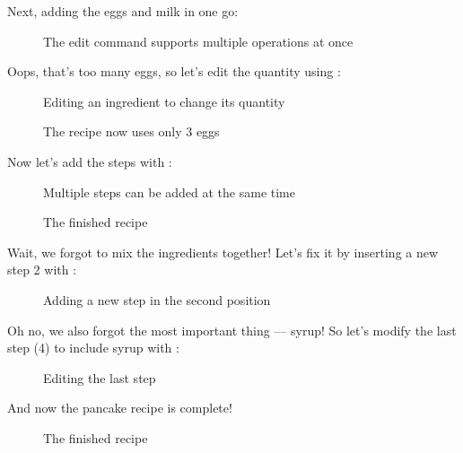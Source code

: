 	\pagebreak
	Next, adding the eggs and milk in one go:
	\vspace{-.5em} %
	\begin{figure}[!htbp]\centering\ContinuedFloat
		\caption{The edit command supports multiple operations at once}
	\end{figure}
	\vspace{-1.5em} %

	Oops, that's too many eggs, so let's edit the quantity using :
	\begin{figure}[!htbp]\centering\ContinuedFloat
		\caption{Editing an ingredient to change its quantity}
	\end{figure}

	\begin{figure}[!htbp]\centering\ContinuedFloat
		\caption{The recipe now uses only 3 eggs}
	\end{figure}

	Now let's add the steps with :
	\begin{figure}[!htbp]\centering\ContinuedFloat
		\caption{Multiple steps can be added at the same time}
	\end{figure}

	\begin{figure}[!htbp]\centering\ContinuedFloat
		\caption{The finished recipe}
	\end{figure}


	Wait, we forgot to mix the ingredients together! Let's fix it by inserting a new step 2 with :
	\begin{figure}[!htbp]\centering\ContinuedFloat
		\caption{Adding a new step in the second position}
	\end{figure}

	Oh no, we also forgot the most important thing --- syrup! So let's modify the last step (4) to include syrup with :
	\begin{figure}[!htbp]\centering\ContinuedFloat
		\caption{Editing the last step}
	\end{figure}
	\vspace{-3em} %

	And now the pancake recipe is complete!
	\vspace{-1em} %
	\begin{figure}[!htbp]\centering\ContinuedFloat
		\caption{The finished recipe}
	\end{figure}

